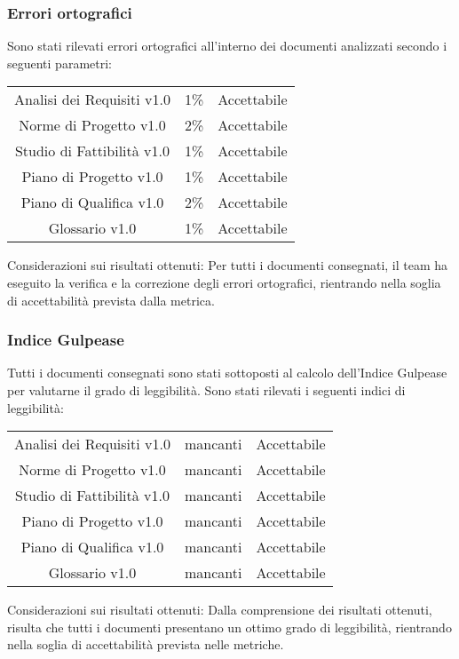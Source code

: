 \subsubsection{Errori ortografici}
Sono stati rilevati errori ortografici all'interno dei documenti analizzati secondo i seguenti parametri:

{
	\centering
	\begin{tabular}{| c | C{1cm} | C{3cm} |}
		Analisi dei Requisiti v1.0 & 1\% & Accettabile \\
		Norme di Progetto v1.0 & 2\% & Accettabile\\
		Studio di Fattibilità v1.0 & 1\% &  Accettabile \\
		Piano di Progetto v1.0 & 1\% & Accettabile \\
		Piano di Qualifica v1.0 & 2\% & Accettabile\\
		Glossario v1.0 & 1\% & Accettabile\\
	\end{tabular}
}

    Considerazioni sui risultati ottenuti: Per tutti i documenti consegnati, il team ha eseguito la verifica e la correzione degli errori ortografici, rientrando nella soglia di accettabilità prevista dalla metrica.

\subsubsection{Indice Gulpease}

Tutti i documenti consegnati sono stati sottoposti al calcolo dell'Indice Gulpease per valutarne il grado di leggibilità.
Sono stati rilevati i seguenti indici di leggibilità:

{
	\centering
	\begin{tabular}{| c | C{3cm} | C{3cm} |}
		Analisi dei Requisiti v1.0 &  mancanti & Accettabile \\
		Norme di Progetto v1.0 & mancanti & Accettabile\\
		Studio di Fattibilità v1.0 & mancanti & Accettabile\\ 
		Piano di Progetto v1.0 & mancanti & Accettabile \\
		Piano di Qualifica v1.0 & mancanti & Accettabile\\
		Glossario v1.0 & mancanti & Accettabile\\
	 \end{tabular}
}

	Considerazioni sui risultati ottenuti: Dalla comprensione dei risultati ottenuti, risulta che tutti i documenti presentano un ottimo grado di leggibilità, rientrando nella soglia di accettabilità prevista nelle metriche.

